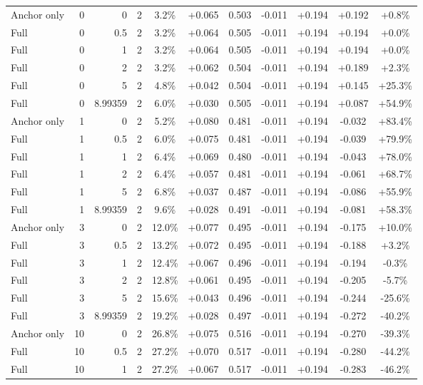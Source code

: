 \begin{table}[htbp]
\begin{tabular}{lrrrccccccc}
Anchor only & 0 & 0 & 2 & 3.2\% & +0.065 & 0.503 & -0.011 & +0.194 & +0.192 & +0.8\% \\
Full & 0 & 0.5 & 2 & 3.2\% & +0.064 & 0.505 & -0.011 & +0.194 & +0.194 & +0.0\% \\
Full & 0 & 1 & 2 & 3.2\% & +0.064 & 0.505 & -0.011 & +0.194 & +0.194 & +0.0\% \\
Full & 0 & 2 & 2 & 3.2\% & +0.062 & 0.504 & -0.011 & +0.194 & +0.189 & +2.3\% \\
Full & 0 & 5 & 2 & 4.8\% & +0.042 & 0.504 & -0.011 & +0.194 & +0.145 & +25.3\% \\
Full & 0 & 8.99359 & 2 & 6.0\% & +0.030 & 0.505 & -0.011 & +0.194 & +0.087 & +54.9\% \\
Anchor only & 1 & 0 & 2 & 5.2\% & +0.080 & 0.481 & -0.011 & +0.194 & -0.032 & +83.4\% \\
Full & 1 & 0.5 & 2 & 6.0\% & +0.075 & 0.481 & -0.011 & +0.194 & -0.039 & +79.9\% \\
Full & 1 & 1 & 2 & 6.4\% & +0.069 & 0.480 & -0.011 & +0.194 & -0.043 & +78.0\% \\
Full & 1 & 2 & 2 & 6.4\% & +0.057 & 0.481 & -0.011 & +0.194 & -0.061 & +68.7\% \\
Full & 1 & 5 & 2 & 6.8\% & +0.037 & 0.487 & -0.011 & +0.194 & -0.086 & +55.9\% \\
Full & 1 & 8.99359 & 2 & 9.6\% & +0.028 & 0.491 & -0.011 & +0.194 & -0.081 & +58.3\% \\
Anchor only & 3 & 0 & 2 & 12.0\% & +0.077 & 0.495 & -0.011 & +0.194 & -0.175 & +10.0\% \\
Full & 3 & 0.5 & 2 & 13.2\% & +0.072 & 0.495 & -0.011 & +0.194 & -0.188 & +3.2\% \\
Full & 3 & 1 & 2 & 12.4\% & +0.067 & 0.496 & -0.011 & +0.194 & -0.194 & -0.3\% \\
Full & 3 & 2 & 2 & 12.8\% & +0.061 & 0.495 & -0.011 & +0.194 & -0.205 & -5.7\% \\
Full & 3 & 5 & 2 & 15.6\% & +0.043 & 0.496 & -0.011 & +0.194 & -0.244 & -25.6\% \\
Full & 3 & 8.99359 & 2 & 19.2\% & +0.028 & 0.497 & -0.011 & +0.194 & -0.272 & -40.2\% \\
Anchor only & 10 & 0 & 2 & 26.8\% & +0.075 & 0.516 & -0.011 & +0.194 & -0.270 & -39.3\% \\
Full & 10 & 0.5 & 2 & 27.2\% & +0.070 & 0.517 & -0.011 & +0.194 & -0.280 & -44.2\% \\
Full & 10 & 1 & 2 & 27.2\% & +0.067 & 0.517 & -0.011 & +0.194 & -0.283 & -46.2\% \\

\end{tabular}
\end{table}
